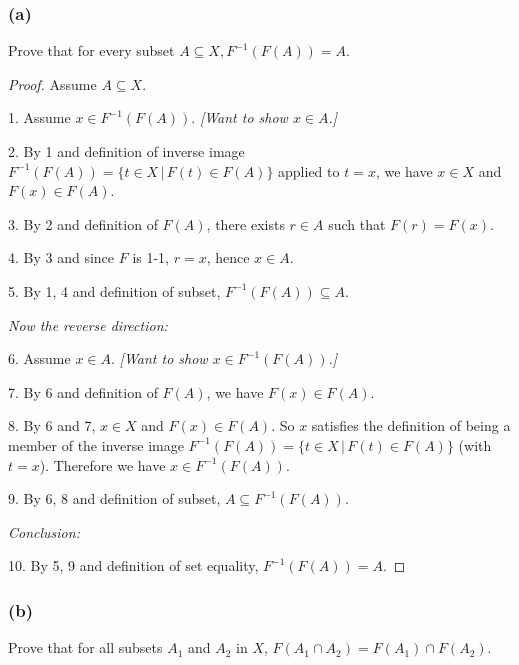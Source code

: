 \documentclass[14pt]{extarticle}
\begin{document}
\subsubsection{(a)}
Prove that for every subset \(A \subseteq X, F^{-1}(F(A)) = A\).

\begin{proof}
    Assume \(A \subseteq X\).

    1. Assume \(x \in F^{-1}(F(A))\). {\it [Want to show \(x \in A\).]}

    2. By 1 and definition of inverse image \(F^{-1}(F(A)) = \{t \in X \, | \, F(t) \in F(A)\}\) applied to $t = x$, we have \(x \in X\) and \(F(x) \in F(A)\).

    3. By 2 and definition of $F(A)$, there exists \(r \in A\) such that \(F(r) = F(x)\).

    4. By 3 and since $F$ is 1-1, $r = x$, hence \(x \in A\).

    5. By 1, 4 and definition of subset, \(F^{-1}(F(A)) \subseteq A\).

        {\it Now the reverse direction:}

    6. Assume \(x \in A\). {\it [Want to show \(x \in F^{-1}(F(A))\).]}

    7. By 6 and definition of $F(A)$, we have \(F(x) \in F(A)\).

    8. By 6 and 7, \(x \in X\) and \(F(x) \in F(A)\). So $x$ satisfies the definition of being a member of the inverse
    image \(F^{-1}(F(A)) = \{t \in X \, | \, F(t) \in F(A)\}\) (with $t = x$). Therefore we have \(x \in F^{-1}(F(A))\).

    9. By 6, 8 and definition of subset, \(A \subseteq F^{-1}(F(A))\).

        {\it Conclusion:}

    10. By 5, 9 and definition of set equality, \(F^{-1}(F(A)) = A\).
\end{proof}

\subsubsection{(b)}
Prove that for all subsets $A_1$ and $A_2$ in $X$, \(F(A_1 \cap A_2) = F(A_1) \cap F(A_2)\).
\end{document}
